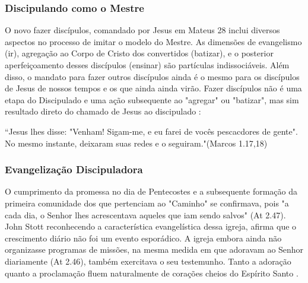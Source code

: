 \documentclass[
	12pt,				%
	openright,			%
	twoside,			%
	a4paper,			%
	english,			%
	french,				%
	spanish,			%
	brazil				%
	]{abntex2}
\begin{document}
\subsubsection{Discipulando como o Mestre}


O novo fazer discípulos, comandado por Jesus em Mateus 28 inclui diversos aspectos no processo de imitar o modelo do Mestre. As dimensões de evangelismo (ir), agregação ao Corpo de Cristo dos convertidos (batizar), e o posterior aperfeiçoamento desses discípulos (ensinar) são partículas indissociáveis. Além disso, o mandato para fazer outros discípulos ainda é o mesmo para os discípulos de Jesus de nossos tempos e os que ainda ainda virão. Fazer discípulos não é uma etapa do Discipulado e uma ação subsequente ao "agregar" ou "batizar", mas sim resultado direto do chamado de Jesus ao discipulado \cite[64]{brandao}:
\begin{citacao}“Jesus lhes disse: "Venham! Sigam-me, e eu farei de vocês pescacdores de gente". No mesmo instante, deixaram suas redes e o seguiram."(Marcos 1.17,18)
\end{citacao}

\subsubsection{Evangelização Discipuladora}

O cumprimento da promessa no dia de Pentecostes e a subsequente formação da primeira comunidade dos que pertenciam ao "Caminho" se confirmava, pois "a cada dia, o Senhor lhes acrescentava aqueles que iam sendo salvos" (At 2.47). John Stott reconhecendo a característica evangelística dessa igreja, afirma que o crescimento diário não foi um evento esporádico. A igreja embora ainda não organizasse programas de missões, na mesma medida em que adoravam ao Senhor diariamente (At 2.46), também exercitava o seu testemunho. Tanto a adoração quanto a proclamação fluem naturalmente de corações cheios do Espírito Santo \cite[118-119]{stott}. 
\end{document}
